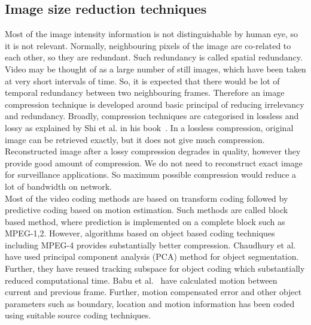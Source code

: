 \subsection{Image size reduction techniques}
\indent Most of the image intensity information is not distinguishable
by human eye, so it is not relevant. Normally, neighbouring pixels of
the image are co-related to each other, so they are redundant. Such
redundancy is called spatial redundancy. Video may be thought of as a
large number of still images, which have been taken at very short
intervals of time. So, it is expected that there would be lot of
temporal redundancy between two neighbouring frames. Therefore an image
compression technique is developed around basic principal of reducing
irrelevancy and redundancy. Broadly, compression techniques are
categorised in lossless and lossy as explained by Shi et al. in his
book~\cite{6}. In a lossless compression, original image can be
retrieved exactly, but it does not give much compression. Reconstructed
image after a lossy compression degrades in quality, however they
provide good amount of compression. We do not need to reconstruct exact
image for surveillance applications. So maximum possible compression
would reduce a lot of bandwidth on network.\\
\indent Most of the video coding methods are based on transform coding
followed by predictive coding based on motion estimation. Such methods
are called block based method, where prediction is implemented on a
complete block such as MPEG-1,2. However, algorithms based
on object based coding techniques~\cite{7, 8} including MPEG-4 provides
substantially better compression. Chaudhury et al.~\cite{7} have used
principal component analysis (PCA) method for object
segmentation. Further, they have reused tracking subspace for object
coding which substantially reduced computational time. Babu et al.~\cite{8}
have calculated motion between current and previous frame.
Further, motion compensated error and other object parameters such as
boundary, location and motion information has been coded using suitable
source coding techniques.
